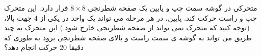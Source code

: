 \exercise
متحرکی در گوشه سمت چپ و پایین یک صفحه شطرنجی
$8 \times 8$
قرار دارد. این متحرک در هر مرحله می تواند یک واحد در یکی از
$4$
جهت بالا‫‪،‬‬ پایین‫‪،‬‬ چپ و راست حرکت کند. (توجه کنید که متحرک نمی تواند از صفحه شطرنجی خارج شود.)
این متحرک به چند طریق می تواند به گوشه ی سمت راست و بالای صفحه شطرنجی برود به طوری که دقیقا
$20$
حرکت انجام دهد؟